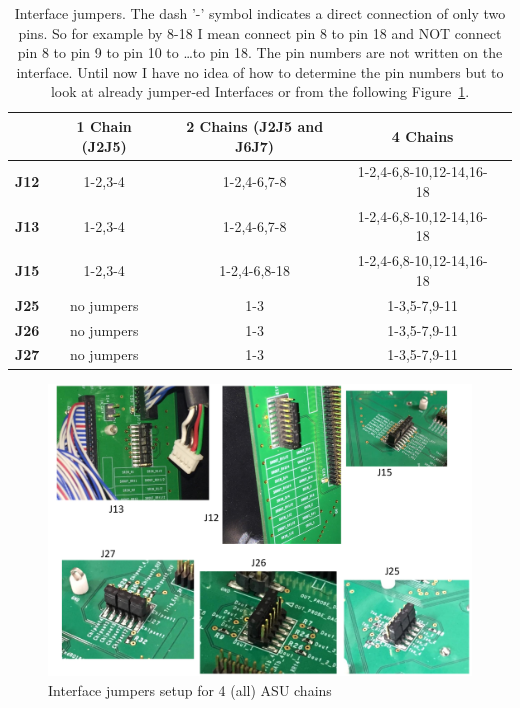 \begin{table}[H]
  \centering \bgroup
  \def\arraystretch{1.5}%
  \begin{tabular}{|c|c|c|c|c|}
    \hline
    & \textbf{1 Chain (J2J5)} & \textbf{2 Chains (J2J5 and J6J7)} & \textbf{4 Chains} \\
    \hline
    \textbf{J12} & 1-2,3-4  & 1-2,4-6,7-8 & 1-2,4-6,8-10,12-14,16-18 \\
    \hline
    \textbf{J13} & 1-2,3-4  & 1-2,4-6,7-8 & 1-2,4-6,8-10,12-14,16-18 \\
    \hline
    \textbf{J15} & 1-2,3-4  & 1-2,4-6,8-18 & 1-2,4-6,8-10,12-14,16-18 \\
    \hline
    \textbf{J25} & no jumpers & 1-3 & 1-3,5-7,9-11 \\
    \hline
    \textbf{J26} & no jumpers & 1-3 & 1-3,5-7,9-11 \\
    \hline
    \textbf{J27} & no jumpers & 1-3 & 1-3,5-7,9-11 \\
    \hline
  \end{tabular}
  \egroup
  \caption{Interface jumpers. The dash '-' symbol indicates a direct connection
    of only two pins. So for example by 8-18 I mean connect pin 8 to pin 18 and NOT
    connect pin 8 to pin 9 to pin 10 to \dots to pin 18. The pin numbers are not
    written on the interface. Until now I have no idea of how to determine the pin
    numbers but to look at already jumper-ed Interfaces or from the following
    Figure~\ref{interface-jumpers}.}\label{tab:IF-jumpers}
\end{table}
\begin{figure}[H] \centering
  \includegraphics[width=0.8\linewidth]{interface-jumpers}
  \caption{Interface jumpers setup for 4 (all) ASU chains}\label{interface-jumpers}
\end{figure}

